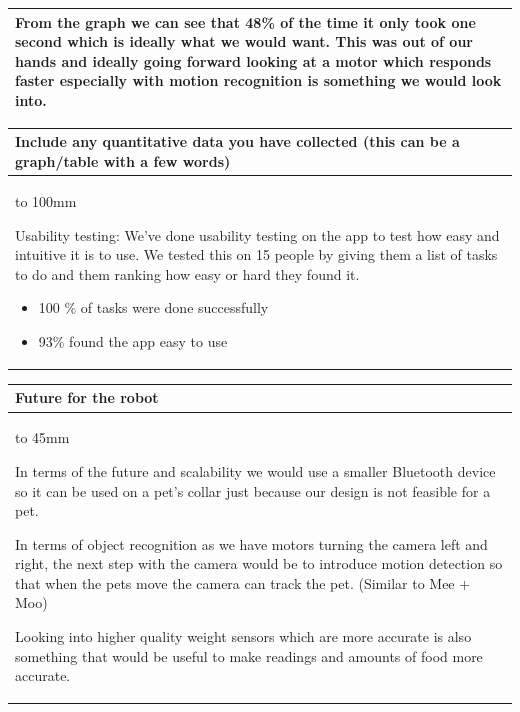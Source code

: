 \documentclass[a4paper]{article}
\newcommand{\colWidth}{141mm}
\begin{document}
\begin{center}
\begin{tabular}{|p{\colWidth}|}
{ From the graph we can see that 48\% of the time it only took one second which is ideally what we would want. This was out of our hands and ideally going forward looking at a motor which responds faster especially with motion recognition is something we would look into.

  }
  \\
  \hline
\end{tabular}
\vskip 5mm

\begin{tabular}{|p{\colWidth}|}
	\hline
	\cellcolor{blue!25}\large
	\textbf{Include any quantitative data you have collected (this can be a graph/table with a few words)}
	\\ \hline
	\vtop to 100mm{

Usability testing:
We've done usability testing on the app to test how easy and intuitive it is to use. We tested this on 15 people by giving them a list of tasks to do and them ranking how easy or hard they found it. 

\begin{itemize}
    \item 100 \% of tasks were done successfully
    \item 93\% found the app easy to use 
\end{itemize}



  }
  \\
  \hline
\end{tabular}
\vskip 5mm

\begin{tabular}{|p{\colWidth}|}
	\hline
	\cellcolor{blue!25}\large
	\textbf{Future for the robot}
	\\ \hline
	\vtop to 45mm{
	
	In terms of the future and scalability  we would use a smaller Bluetooth device so it can be used on a pet's collar just because our design is not feasible for a pet.
	\vspace{5mm}
	
	In terms of object recognition as we have motors turning the camera left and right, the next step with the camera would be to introduce motion detection so that when the pets move the camera can track the pet. (Similar to Mee + Moo)
	
	\vspace{5mm}
	
	Looking into higher quality weight sensors which are more accurate is also something that would be useful to make readings and amounts of food more accurate.
	


}
  \\
  \hline
  
\end{tabular}

\end{center}
  
\end{document}
